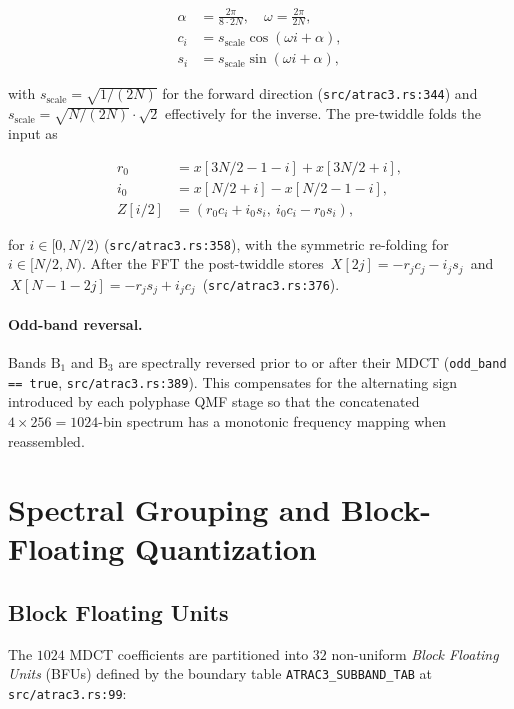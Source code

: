 \documentclass[11pt]{article}
\begin{document}
\begin{align}
\alpha &= \frac{2\pi}{8\cdot 2N}, \quad \omega = \frac{2\pi}{2N}, \\
c_i &= s_{\text{scale}}\cos(\omega i + \alpha),\\
s_i &= s_{\text{scale}}\sin(\omega i + \alpha),
\end{align}

\noindent
with \(s_{\text{scale}} = \sqrt{1/(2N)}\) for the forward direction
(\texttt{src/atrac3.rs:344}) and \(s_{\text{scale}} = \sqrt{N/(2N)} \cdot
\sqrt{2}\) effectively for the inverse. The pre-twiddle folds the input as

\begin{align}
r_0 &= x[3N/2 - 1 - i] + x[3N/2 + i], \\
i_0 &= x[N/2 + i] - x[N/2 - 1 - i], \\
Z[i/2] &= (r_0 c_i + i_0 s_i,\ i_0 c_i - r_0 s_i),
\end{align}

\noindent
for \(i \in [0, N/2)\) (\texttt{src/atrac3.rs:358}), with the symmetric
re-folding for \(i \in [N/2, N)\). After the FFT the post-twiddle stores
\(\,X[2j] = -r_j c_j - i_j s_j\,\) and \(\,X[N-1-2j] = -r_j s_j + i_j c_j\,\)
(\texttt{src/atrac3.rs:376}).

\paragraph{Odd-band reversal.}
Bands \(\text{B}_1\) and \(\text{B}_3\) are spectrally reversed prior to or
after their MDCT (\texttt{odd\_band == true},
\texttt{src/atrac3.rs:389}). This compensates for the alternating sign
introduced by each polyphase QMF stage so that the concatenated
\(4\!\times\!256 = 1024\)-bin spectrum has a monotonic frequency mapping
when reassembled.

\section{Spectral Grouping and Block-Floating Quantization}
\label{sec:bfu}

\subsection{Block Floating Units}

The \(1024\) MDCT coefficients are partitioned into \(32\) non-uniform
\emph{Block Floating Units} (BFUs) defined by the boundary table
\texttt{ATRAC3\_SUBBAND\_TAB} at \texttt{src/atrac3.rs:99}:
\end{document}
